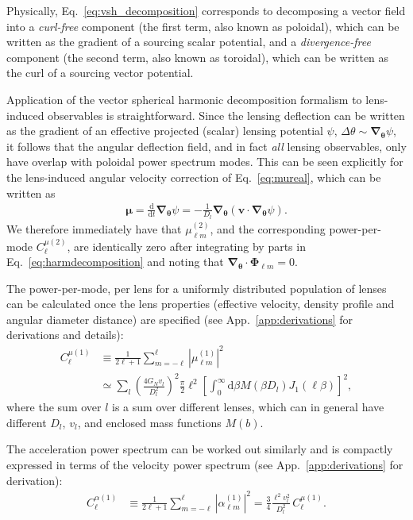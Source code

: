 \documentclass[twocolumn]{aastex63}
\newcommand{\vect}[1]{\boldsymbol{\mathbf{#1}}}
\newcommand{\dd}{\mathrm{d}}
\newcommand{\blue}[1]{\textcolor{deepblue}{\bf #1}}
\begin{document}
Physically, Eq.~\ref{eq:vsh_decomposition} corresponds to decomposing a vector field into a \emph{curl-free} component (the first term, also known as poloidal), which can be written as the gradient of a sourcing scalar potential, and a \emph{divergence-free} component (the second term, also known as toroidal), which can be written as the curl of a sourcing vector potential. 

Application of the vector spherical harmonic decomposition formalism to lens-induced observables is straightforward. Since the lensing deflection can be written as the gradient of an effective projected (scalar) lensing potential $\psi$, $\Delta\theta \sim \vect{\nabla}_{\vect{\theta}} \psi$, it follows that the angular deflection field, and in fact \emph{all} lensing observables, only have overlap with poloidal power spectrum modes. This can be seen explicitly for the lens-induced angular velocity correction of Eq.~\ref{eq:mureal}, which can be written as
\begin{align}
 \vect{\mu} =  \frac{\dd}{\dd t} \vect{\nabla}_{\vect{\theta}} \psi = - \frac{1}{D_l} \vect{\nabla}_{\vect{\theta}} \left(\vect{v} \cdot \vect{\nabla}_{\vect{\theta}} \psi \right) \label{eq:deflectionpotential}.
\end{align} 
We therefore immediately have that $\mu_{\ell m}^{(2)}$, and the corresponding power-per-mode $C_{\ell}^{\mu (2)}$, are identically zero after integrating by parts in Eq.~\ref{eq:harmdecomposition} and noting that $\vect{\nabla}_{\vect{\theta}} \cdot \vect{\Phi}_{\ell m} = 0$.

The power-per-mode, per lens for a uniformly distributed population of lenses can be calculated once the lens properties (effective velocity, density profile and angular diameter distance) are specified (see App.~\ref{app:derivations} for derivations and details):
\begin{align}
C_{\ell}^{\mu (1)} &\equiv \frac{1}{2\ell + 1} \sum_{m = -\ell}^{\ell} \left| \mu_{\ell m}^{(1)} \right|^2 \nonumber \\
&\simeq \sum_l \left(\frac{4 G_N v_l}{D_l^2}\right)^2 \frac{\pi}{2} \ell^2 \left[\int_0^\infty \dd \beta M(\beta D_l) J_1(\ell \beta) \right]^2, \label{eq:pspec_mu}
\end{align}
where the sum over $l$ is a sum over different lenses, which can in general have different $D_l$, $v_l$, and enclosed mass functions $M(b)$.

The acceleration power spectrum can be worked out similarly and is compactly expressed in terms of the velocity power spectrum (see App.~\ref{app:derivations} for derivation): 
\begin{align}
C_{\ell}^{\alpha (1)} &\equiv \frac{1}{2\ell + 1} \sum_{m = -\ell}^{\ell} \left| \alpha_{\ell m}^{(1)} \right|^2 = \frac{3}{4} \frac{\ell^2 v_l^2}{D_l^2}\,C_{\ell}^{\mu (1)}.
\label{eq:pspec_alpha}
\end{align}
\end{document}
